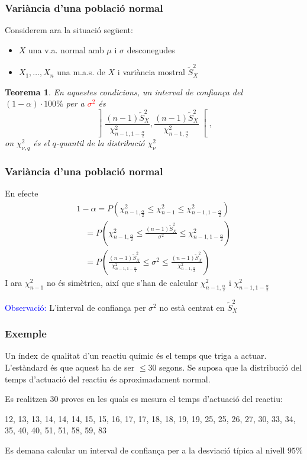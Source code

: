 \documentclass[12pt,t]{beamer}
\newcommand{\red}[1]{\textcolor{red}{#1}}
\newcommand{\blue}[1]{\textcolor{blue}{#1}}
\renewcommand{\leq}{\leqslant}
\theoremstyle{plain}
\newtheorem{teorema}{Teorema}
\theoremstyle{definition}
\begin{document}
\begin{frame}
\frametitle{Variància d'una població normal}


Considerem ara la situació següent:
\begin{itemize}
\item  $X$ una v.a. normal amb $\mu$ i $\sigma$ desconegudes

\item $X_1,\ldots,X_n$ una m.a.s. de $X$ i variància mostral $\widetilde{S}_X^2$
\end{itemize}


\begin{teorema}
En aquestes condicions,  un interval  de confiança del $(1-\alpha)\cdot 100\%$ per a \red{$\sigma^2$}
és  
$$
\left] \frac{(n-1)\widetilde{S}_{X}^2}{\chi_{n-1,1-\frac{\alpha}{2}}^2},
\frac{(n-1)\widetilde{S}_{X}^2}{\chi_{n-1,\frac{\alpha}{2}}^2}
\right[,
$$
on $\chi_{\nu,q}^2$ és el $q$-quantil de la distribució $\chi_{\nu}^2$
\end{teorema}
\end{frame}


\begin{frame}
\frametitle{Variància d'una població normal}

En efecte
$$
\begin{array}{l}
1-\alpha=P\left(\chi_{n-1,\frac{\alpha}{2}}^2\leq \chi_{n-1}^2\leq
\chi_{n-1,1-\frac{\alpha}{2}}^2\right)\\[2ex]
\quad\displaystyle =P\left(\chi_{n-1,\frac{\alpha}{2}}^2\leq \frac{(n-1) \widetilde{S}_{X}^2}{\sigma^2}\leq
\chi_{n-1,1-\frac{\alpha}{2}}^2
\right)\\[2ex]
\quad\displaystyle = P\left(\frac{(n-1)
\widetilde{S}_{X}^2}{\chi_{n-1,1-\frac{\alpha}{2}}^2}\leq\sigma^2\leq\frac{
(n-1)\widetilde{S}_{X}^2}{\chi_{n-1,\frac{\alpha}{2}}^2}
\right)
\end{array}
$$
I ara $\chi_{n-1}^2$ no és simètrica, així que s'han de calcular $\chi_{n-1,\frac{\alpha}{2}}^2$ i $\chi_{n-1,1-\frac{\alpha}{2}}^2$
\medskip

\blue{Observació:} L'interval de confiança per $\sigma^2$ no està
centrat en $\widetilde{S}_{X}^2$

\end{frame}


\begin{frame}
\frametitle{Exemple}

Un índex de qualitat d'un reactiu químic és el temps que triga a
actuar. L'estàndard és que aquest ha de ser $\leq 30$ segons.
Se suposa que la distribució del temps d'actuació del reactiu és
aproximadament normal. 
\medskip


Es realitzen 30 proves en les quals es mesura el temps
d'actuació del reactiu:
\medskip

12, 13, 13, 14, 14, 14, 15, 15, 16, 17, 17, 18, 18, 19, 19, 25, 25, 26, 27, 30,
33, 34, 35, 40, 40, 51, 51, 58, 59, 83
\medskip

Es demana calcular un interval de confiança per a la desviació típica al nivell
$95\%$
\end{frame}
\end{document}

